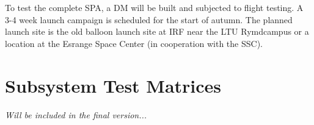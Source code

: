 \noindent
To test the complete \ac{SPA}, a \ac{DM} will be built and subjected to flight testing. A 3-4 week launch campaign is scheduled for the start of autumn. The planned launch site is the old balloon launch site at \ac{IRF} near the \ac{LTU} Rymdcampus or a location at the Esrange Space Center (in cooperation with the \ac{SSC}).



\section{Subsystem Test Matrices}
\label{sec:test_matrices}

\textit{Will be included in the final version...}


